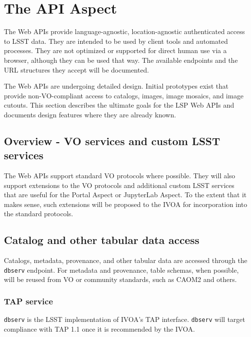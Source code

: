 \section{The API Aspect}\label{api-aspect}

The Web APIs provide language-agnostic, location-agnostic authenticated access
to LSST data.  They are intended to be used by client tools and automated
processes.  They are not optimized or supported for direct human use via a
browser, although they can be used that way.  The available endpoints and the
URL structures they accept will be documented.

The Web APIs are undergoing detailed design.  Initial prototypes exist that
provide non-VO-compliant access to catalogs, images, image mosaics, and image
cutouts.  This section describes the ultimate goals for the LSP Web APIs and
documents design features where they are already known.

\subsection{Overview - VO services and custom LSST services}\label{api-overview}

The Web APIs support standard VO protocols where possible.  They will also
support extensions to the VO protocols and additional custom LSST services that
are useful for the Portal Aspect or JupyterLab Aspect.  To the extent that it
makes sense, such extensions will be proposed to the IVOA for incorporation
into the standard protocols.

\subsection{Catalog and other tabular data access}\label{catalog-and-other-tabular-data-access}

Catalogs, metadata, provenance, and other tabular data are accessed through the
\texttt{dbserv} endpoint. For metadata and provenance, table schemas, when
possible, will be reused from VO or community standards, such as CAOM2
\citep{CAOM2} and others.

\subsubsection{TAP service}\label{tap-and-other-vo-compliant-services}

\texttt{dbserv} is the LSST implementation of IVOA's TAP interface.
\texttt{dbserv} will target compliance with TAP 1.1 once it is recommended
by the IVOA.

